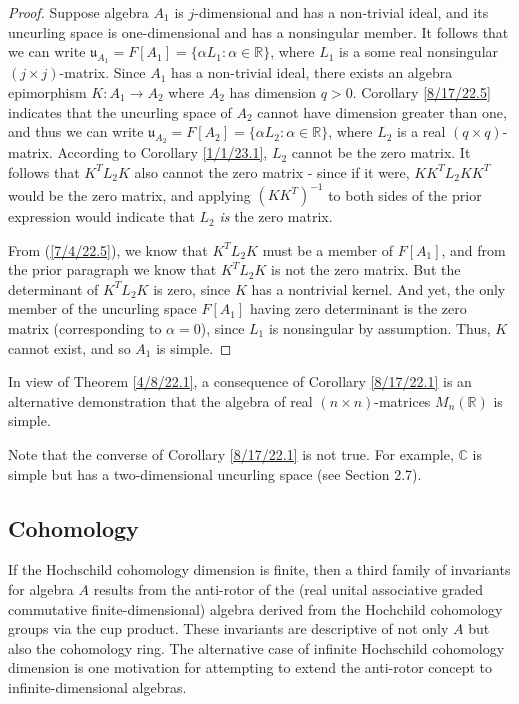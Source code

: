 \documentclass{amsart}
\numberwithin{equation}{section}
\theoremstyle{definition}
\numberwithin{theorem}{section}
\begin{document}
\begin{proof} Suppose algebra $A_1$ is $j$-dimensional and has a non-trivial ideal, and its uncurling space is one-dimensional and has a nonsingular member.  It follows that we can write $\mathfrak{u}_{A_1} = F[A_1] = \{\alpha L_1:\alpha\in \mathbb{R}\}$, where $L_1$ is a some real nonsingular $(j\times j)$-matrix.  Since $A_1$ has a non-trivial ideal, there exists an algebra epimorphism $K:A_1\rightarrow A_2$ where $A_2$ has dimension $q>0$.  Corollary \ref{8/17/22.5} indicates that the uncurling space of $A_2$ cannot have dimension greater than one, and thus we can write $\mathfrak{u}_{A_2} = F[A_2] = \{\alpha L_2:\alpha\in \mathbb{R}\}$, where $L_2$ is a real $(q\times q)$-matrix.  According to Corollary \ref{1/1/23.1}, $L_2$ cannot be the zero matrix. It follows that $K^T L_2 K$ also cannot the zero matrix - since if it were, $KK^T L_2 KK^T$ would be the zero matrix, and applying $(KK^T)^{-1}$ to both sides of the prior expression would indicate that $L_2$ {\it is} the zero matrix.  

From (\ref{7/4/22.5}), we know that $ K^T L_2 K$ must be a member of $F[A_1]$, and from the prior paragraph we know that $ K^T L_2 K$ is not the zero matrix.  But the determinant of $K^T L_2 K$ is zero, since $K$ has a  nontrivial kernel.  And yet, the only member of the uncurling space $F[A_1]$ having zero determinant is the zero matrix (corresponding to $\alpha=0$), since $L_1$ is nonsingular by assumption.   Thus, $K$ cannot exist, and so $A_1$ is simple. \end{proof}

In view of Theorem \ref{4/8/22.1}, a consequence of Corollary \ref{8/17/22.1} is an alternative demonstration that the algebra of real $(n\times n)$-matrices $ M_n(\mathbb{R})$ is simple.  

Note that the converse of Corollary \ref{8/17/22.1} is not true.  For example, $\mathbb{C}$ is simple but has a two-dimensional uncurling space (see Section 2.7). 

\subsection{Cohomology} 
If the Hochschild cohomology dimension is finite, then a third family of invariants for algebra $A$ results from the anti-rotor of the (real unital associative graded commutative finite-dimensional) algebra derived from the Hochchild \mbox{cohomology} groups via the cup product.  These invariants are descriptive of not only $A$ but also the cohomology ring.  The alternative case of infinite Hochschild cohomology dimension is one motivation for attempting to extend the anti-rotor concept to infinite-dimensional algebras. 
\end{document}
